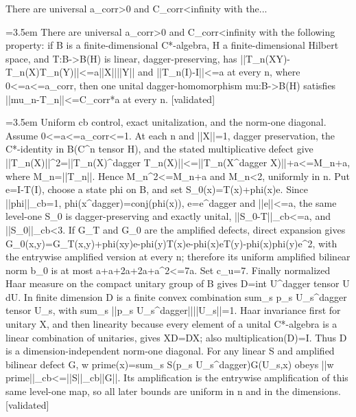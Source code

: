 \documentclass{article}
\newcommand{\step}[1]{\par\noindent\hangindent=3.5em\hangafter=1%
  \makebox[3.5em][l]{\textbf{#1.}}}
\newcommand{\steptag}[1]{\hfill{\small\textsf{[#1]}}}
\begin{document}
\begin{proofbox}{There are universal a\_corr>0 and C\_corr<infinity with the...}
\step{1} There are universal a\_corr>0 and C\_corr<infinity with the following property: if B is a finite-dimensional C*-algebra, H a finite-dimensional Hilbert space, and T:B->B(H) is linear, dagger-preserving, has ||T\_n(XY)-T\_n(X)T\_n(Y)||<=a||X||||Y|| and ||T\_n(I)-I||<=a at every n, where 0<=a<=a\_corr, then one unital dagger-homomorphism mu:B->B(H) satisfies ||mu\_n-T\_n||<=C\_corr*a at every n. \steptag{validated} \\[6pt]
\step{1.1} Uniform cb control, exact unitalization, and the norm-one diagonal. Assume 0<=a<=a\_corr<=1. At each n and ||X||=1, dagger preservation, the C*-identity in B(C\textasciicircum{}n tensor H), and the stated multiplicative defect give ||T\_n(X)||\textasciicircum{}2=||T\_n(X)\textasciicircum{}dagger T\_n(X)||<=||T\_n(X\textasciicircum{}dagger X)||+a<=M\_n+a, where M\_n=||T\_n||. Hence M\_n\textasciicircum{}2<=M\_n+a and M\_n<2, uniformly in n. Put e=I-T(I), choose a state phi on B, and set S\_0(x)=T(x)+phi(x)e. Since ||phi||\_cb=1, phi(x\textasciicircum{}dagger)=conj(phi(x)), e=e\textasciicircum{}dagger and ||e||<=a, the same level-one S\_0 is dagger-preserving and exactly unital, ||S\_0-T||\_cb<=a, and ||S\_0||\_cb<3. If G\_T and G\_0 are the amplified defects, direct expansion gives G\_0(x,y)=G\_T(x,y)+phi(xy)e-phi(y)T(x)e-phi(x)eT(y)-phi(x)phi(y)e\textasciicircum{}2, with the entrywise amplified version at every n; therefore its uniform amplified bilinear norm b\_0 is at most a+a+2a+2a+a\textasciicircum{}2<=7a. Set c\_u=7. Finally normalized Haar measure on the compact unitary group of B gives D=int U\textasciicircum{}dagger tensor U dU. In finite dimension D is a finite convex combination sum\_s p\_s U\_s\textasciicircum{}dagger tensor U\_s, with sum\_s ||p\_s U\_s\textasciicircum{}dagger||||U\_s||=1. Haar invariance first for unitary X, and then linearity because every element of a unital C*-algebra is a linear combination of unitaries, gives XD=DX; also multiplication(D)=I. Thus D is a dimension-independent norm-one diagonal. For any linear S and amplified bilinear defect G, w prime(x)=sum\_s S(p\_s U\_s\textasciicircum{}dagger)G(U\_s,x) obeys ||w prime||\_cb<=||S||\_cb||G||. Its amplification is the entrywise amplification of this same level-one map, so all later bounds are uniform in n and in the dimensions. \steptag{validated} \\[4pt]

\end{proofbox}
\end{document}
